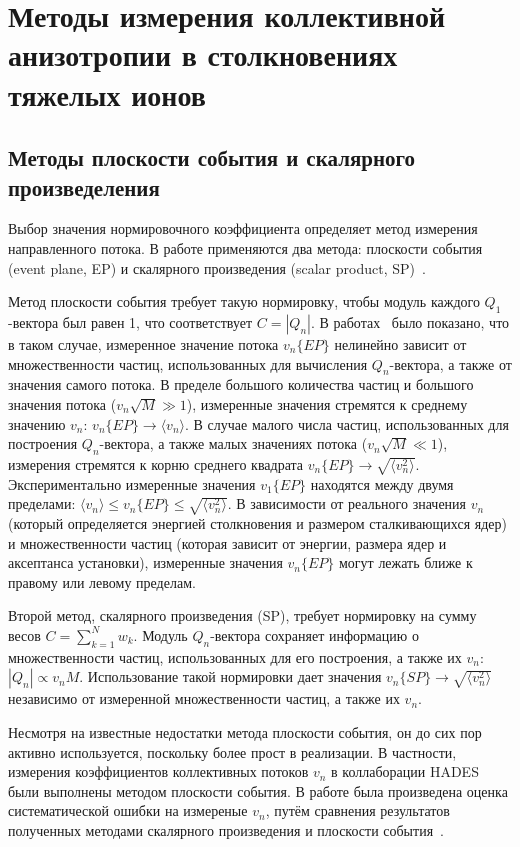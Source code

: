 \section{Методы измерения коллективной анизотропии в столкновениях тяжелых ионов}

\subsection{Методы плоскости события и скалярного произведеления}

Выбор значения нормировочного коэффициента определяет метод измерения направленного потока. 
В работе применяются два метода: плоскости события (event plane, EP) и скалярного произведения (scalar product, SP)~\cite{Mamaev:2020lpi}. 

Метод плоскости события требует такую нормировку, чтобы модуль каждого $Q_1$-вектора был равен 1, что соответствует $C=|Q_n|$. 
В работах~\cite{Borghini:2001vi, Bhalerao:2006tp} было показано, что в таком случае, измеренное значение потока $v_n\{EP\}$ нелинейно зависит от множественности частиц, использованных для вычисления $Q_n$-вектора, а также от значения самого потока. 
В пределе большого количества частиц и большого значения потока ($v_n \sqrt{M} \gg 1$), измеренные значения стремятся к среднему значению $v_n$: $v_n\{EP\} \xrightarrow{} \langle v_n \rangle$. 
В случае малого числа частиц, использованных для построения $Q_n$-вектора, а также малых значениях потока ($v_n \sqrt{M} \ll 1$), измерения стремятся к корню среднего квадрата $ v_n\{EP\} \xrightarrow{} \sqrt{ \langle v_n^2 \rangle }$.
Экспериментально измеренные значения $v_1\{EP\}$ находятся между двумя пределами: $ \langle v_n \rangle \leq v_n\{EP\} \leq \sqrt{ \langle v_n^2 \rangle } $.
В зависимости от реального значения $v_n$ (который определяется энергией столкновения и размером сталкивающихся ядер) и множественности частиц (которая зависит от энергии, размера ядер и аксептанса установки), измеренные значения $v_n\{EP\}$ могут лежать ближе к правому или левому пределам.

Второй метод, скалярного произведения (SP), требует нормировку на сумму весов $C=\sum_{k=1}^N w_k$.
Модуль $Q_n$-вектора сохраняет информацию о множественности частиц, использованных для его построения, а также их $v_n$: $|Q_n| \propto v_n M$.
Использование такой нормировки дает значения $v_n\{SP\} \xrightarrow{} \sqrt{\langle v_n^2 \rangle}$ независимо от измеренной множественности частиц, а также их $v_n$.

Несмотря на известные недостатки метода плоскости события, он до сих пор активно используется, поскольку более прост в реализации. 
В частности, измерения коэффициентов коллективных потоков $v_n$ в коллаборации HADES~\cite{HADES:2020lob} были выполнены методом плоскости события. 
В работе была произведена оценка систематической ошибки на измереные $v_n$, путём сравнения результатов полученных методами скалярного произведения и плоскости события~\cite{Mamaev:2020lpi}.

